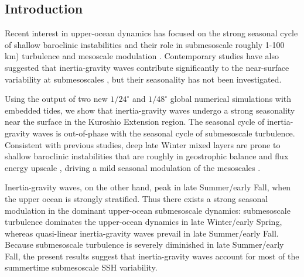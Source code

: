\documentclass[grl]{agutex2015}
\begin{document}
\begin{article}

%
%

\section{Introduction}

Recent interest in upper-ocean dynamics has focused on the strong seasonal
cycle of shallow baroclinic instabilities and their role in submesoscale roughly 1-100 km)
turbulence and mesoscale modulation \citep{sasaki_etal2014,qiu_etal2014,
callies_etal2015, thompson_etal2016,buckingham_etal2016}. Contemporary studies
have also suggested that inertia-gravity waves contribute significantly
to the near-surface variability at submesoscales \citep{richman_etal2012,
buhler_etal2014,rocha_etal2016}, but their seasonality has not been investigated.

Using the output of two new $1/24^\circ$ and $1/48^\circ$ global
numerical simulations with embedded tides, we show that inertia-gravity waves undergo
a strong seasonality near the surface in the Kuroshio Extension region.
The seasonal cycle of inertia-gravity waves is out-of-phase
with the seasonal cycle of submesoscale turbulence. Consistent with previous studies,
deep late Winter mixed layers are prone to
shallow baroclinic instabilities that are roughly in geostrophic balance
and flux energy upscale \citep{sasaki_etal2014,callies_etal2016},
driving a mild seasonal modulation of the mesoscales \citep{sasaki_etal2014,qiu_etal2014}.

Inertia-gravity waves, on the other hand, peak in late Summer/early Fall,
when the upper ocean is strongly stratified. Thus there exists a
strong seasonal modulation in the dominant upper-ocean submesoscale dynamics:
submesoscale turbulence dominates the upper-ocean dynamics in late Winter/early Spring,
whereas quasi-linear inertia-gravity waves prevail in late Summer/early Fall.
Because submesoscale turbulence is severely diminished in late Summer/early Fall,
the present results suggest that inertia-gravity waves account for most of the
summertime submesoscale SSH variability.


\end{article}
\end{document}

